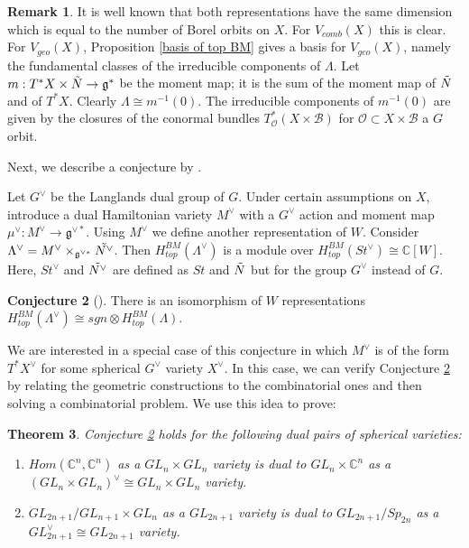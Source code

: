 \documentclass[12pt]{article}
\newcommand{\B}{\mathcal{B}}
\newcommand{\C}{\mathbb{C}}
\newcommand{\s}{\mathcal{O}}
\theoremstyle{plain}
\newtheorem{theorem}{Theorem}[section]
\theoremstyle{definition}
\newtheorem{conj}[theorem]{Conjecture}
\newtheorem{Remark}[theorem]{Remark}
\begin{document}
\begin{Remark}
    It is well known that both representations have the same dimension which is equal to the number of Borel orbits on $X$. For $V_{comb}(X)$ this is clear. For $V_{geo}(X)$, Proposition \ref{basis of top BM} gives a basis for $V_{geo}(X)$, namely the fundamental classes of the irreducible components of $\Lambda$. Let $m:T^*X\times\Tilde{N}\rightarrow\mathfrak{g}^*$ be the moment map; it is the sum of the moment map of $\Tilde{N}$ and of $T^*X$. Clearly $\Lambda\cong m^{-1}(0)$. The irreducible components of $m^{-1}(0)$ are given by the closures of the conormal bundles $T^*_\s(X\times\B)$ for $\s\subset X\times \B$ a $G$ orbit.
\end{Remark}

Next, we describe a conjecture by \cite{FGT}.

 Let $G^\vee$ be the Langlands dual group of $G$. Under certain assumptions on $X$, \cite{benzvi2024relativelanglandsduality} introduce a dual Hamiltonian variety $M^\vee$ with a $G^\vee$ action and moment map $\mu^\vee:M^\vee\rightarrow \mathfrak{g}^{\vee*}$. Using $M^\vee$ we define another representation of $W$. Consider $\Lambda^\vee=M^\vee\times_{\mathfrak{g}^{\vee*}}\Tilde{N^\vee}$. Then $H^{BM}_{top}(\Lambda^\vee)$ is a module over $H^{BM}_{top}(St^\vee)\cong \C[W]$. Here, $St^\vee$ and $\Tilde{N^\vee}$ are defined as $St$ and $\Tilde{N}$ but for the group $G^\vee$ instead of $G$. 


\begin{conj}[\cite{FGT}]\label{main conj}
    There is an isomorphism of $W$ representations 
    $H^{BM}_{top}(\Lambda^\vee)\cong sgn\otimes H^{BM}_{top}(\Lambda)$.
\end{conj}

We are interested in a special case of this conjecture in which $M^\vee$ is of the form $T^*X^\vee$ for some spherical $G^\vee$ variety $X^\vee$. In this case, we can verify Conjecture \ref{main conj} by relating the geometric constructions to the combinatorial ones and then solving a combinatorial problem. We use this idea to prove:

\begin{theorem}\label{application}
    Conjecture \ref{main conj} holds for the following dual pairs of spherical varieties:
    \begin{enumerate}
        \item $Hom(\C^n,\C^n)$ as a $GL_n\times GL_n$ variety is dual to $GL_n\times \C^n$ as a $(GL_n\times GL_n)^\vee\cong GL_n\times GL_n$ variety.
        \item $GL_{2n+1}/GL_{n+1}\times GL_n$ as a $GL_{2n+1}$ variety is dual to $GL_{2n+1}/Sp_{2n}$ as a $GL_{2n+1}^\vee\cong GL_{2n+1}$ variety.
    \end{enumerate}
\end{theorem}
\end{document}
